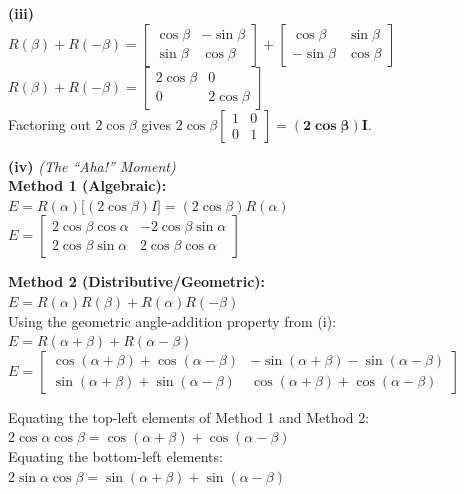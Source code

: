 \begin{solution}
\medskip
\textbf{(iii)} \\
$R(\beta) + R(-\beta) = \begin{bmatrix} \cos\beta & -\sin\beta \\ \sin\beta & \cos\beta \end{bmatrix} + \begin{bmatrix} \cos\beta & \sin\beta \\ -\sin\beta & \cos\beta \end{bmatrix}$ \\
$R(\beta) + R(-\beta) = \begin{bmatrix} 2\cos\beta & 0 \\ 0 & 2\cos\beta \end{bmatrix}$ \\
Factoring out $2\cos\beta$ gives $2\cos\beta \begin{bmatrix} 1 & 0 \\ 0 & 1 \end{bmatrix} = \mathbf{(2\cos\beta)I}$.

\medskip
\textbf{(iv)} \textit{(The ``Aha!'' Moment)} \\
\textbf{Method 1 (Algebraic):} \\
$E = R(\alpha) \big[ (2\cos\beta)I \big] = (2\cos\beta) R(\alpha)$ \\
$E = \begin{bmatrix} 2\cos\beta\cos\alpha & -2\cos\beta\sin\alpha \\ 2\cos\beta\sin\alpha & 2\cos\beta\cos\alpha \end{bmatrix}$ 

\medskip
\textbf{Method 2 (Distributive/Geometric):} \\
$E = R(\alpha)R(\beta) + R(\alpha)R(-\beta)$ \\
Using the geometric angle-addition property from (i): \\
$E = R(\alpha+\beta) + R(\alpha-\beta)$ \\
$E = \begin{bmatrix} \cos(\alpha+\beta) + \cos(\alpha-\beta) & -\sin(\alpha+\beta) - \sin(\alpha-\beta) \\ \sin(\alpha+\beta) + \sin(\alpha-\beta) & \cos(\alpha+\beta) + \cos(\alpha-\beta) \end{bmatrix}$

\medskip
Equating the top-left elements of Method 1 and Method 2: \\
\textbf{$2\cos\alpha\cos\beta = \cos(\alpha+\beta) + \cos(\alpha-\beta)$} \\
Equating the bottom-left elements: \\
\textbf{$2\sin\alpha\cos\beta = \sin(\alpha+\beta) + \sin(\alpha-\beta)$}
\end{solution}

